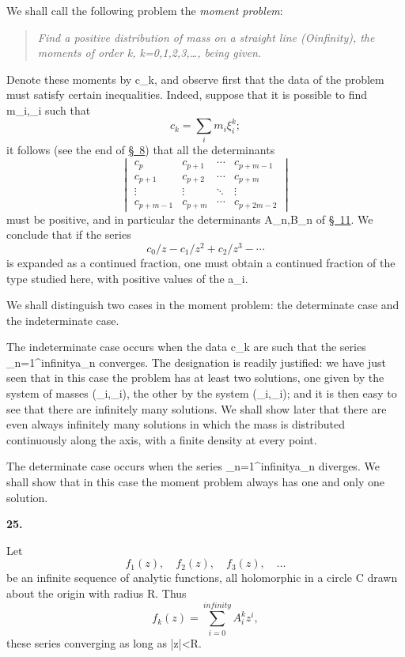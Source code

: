 \documentclass[
  paper=b5,
  fontsize=13pt,
  twoside,
  headings=normal,
  bookmarkpackage=false
]{scrartcl}
\theoremstyle{stieltjesplain}
\theoremstyle{stieltjesdefinition}
\def\({}\def\){}%
\def\frac#1#2{#1/#2}%
\def\infty{infinity}%
\newcommand{\origsection}[1]{%
  \par\addvspace{0.85\baselineskip}%
  \phantomsection\label{sec:#1}%
  \addcontentsline{toc}{subsection}{\texorpdfstring{\S~#1}{Section #1}}%
  \noindent\textbf{#1.}\quad\ignorespaces
}
\begin{document}
We shall call the following problem the \emph{moment problem}:
\begin{quote}\itshape
Find a positive distribution of mass on a straight line \((O\infty)\),
the moments of order \(k\), \(k=0,1,2,3,\ldots\), being given.
\end{quote}
Denote these moments by \(c_k\), and observe first that the data of the
problem must satisfy certain inequalities. Indeed, suppose that it is
possible to find \(m_i,\xi_i\) such that
\[
 c_k=\sum_i m_i\xi_i^k;
\]
it follows (see the end of \hyperref[sec:8]{\S~8}) that all the
determinants
\[
 \begin{vmatrix}
 c_p&c_{p+1}&\cdots&c_{p+m-1}\\
 c_{p+1}&c_{p+2}&\cdots&c_{p+m}\\
 \vdots&\vdots&\ddots&\vdots\\
 c_{p+m-1}&c_{p+m}&\cdots&c_{p+2m-2}
 \end{vmatrix}
\]
must be positive, and in particular the determinants \(A_n,B_n\) of
\hyperref[sec:11]{\S~11}. We conclude that if the series
\[
 \frac{c_0}{z}-\frac{c_1}{z^2}+\frac{c_2}{z^3}-\cdots
\]
is expanded as a continued fraction, one must obtain a continued fraction
of the type studied here, with positive values of the \(a_i\).

We shall distinguish two cases in the moment problem: the determinate
case and the indeterminate case.

The indeterminate case occurs when the data \(c_k\) are such that the
series \(\sum_{n=1}^{\infty}a_n\) converges. The designation is readily
justified: we have just seen that in this case the problem has at least two
solutions, one given by the system of masses \((\mu_i,\lambda_i)\), the
other by the system \((\nu_i,\theta_i)\); and it is then easy to see that
there are infinitely many solutions. We shall show later that there are
even always infinitely many solutions in which the mass is distributed
continuously along the axis, with a finite density at every point.

The determinate case occurs when the series
\(\sum_{n=1}^{\infty}a_n\) diverges. We shall show that in this case the
moment problem always has one and only one solution.


\origsection{25}
Let
\[
 f_1(z),\quad f_2(z),\quad f_3(z),\quad\ldots
\]
be an infinite sequence of analytic functions, all holomorphic in a circle
\(C\) drawn about the origin with radius \(R\). Thus
\[
 f_k(z)=\sum_{i=0}^{\infty}A_i^kz^i,
\]
these series converging as long as \(|z|<R\).
\end{document}
